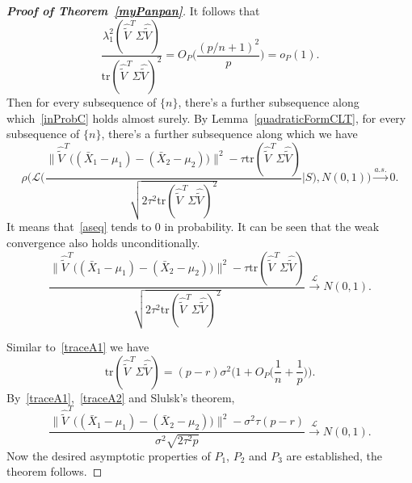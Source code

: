 \documentclass[review]{elsarticle}
\theoremstyle{plain}
\theoremstyle{definition}
\theoremstyle{remark}
\begin{document}
\begin{proof}[\textbf{Proof of Theorem~\ref{myPanpan}}]
    It follows that
\begin{equation}\label{inProbC}
        \frac{\lambda_1^2(\hat{\tilde{V}}^T\Sigma\hat{\tilde{V}})}{\mathrm{tr}(\hat{\tilde{V}}^T\Sigma\hat{\tilde{V}})^2}
        =O_P\Big(\frac{{(p/n+1)}^2}{p}\Big)=o_P(1).
\end{equation}
Then for every subsequence of $\{n\}$, there's a further subsequence along which~\eqref{inProbC} holds almost surely.
By Lemma~\ref{quadraticFormCLT}, for every subsequence of $\{n\}$, there's a further subsequence along which we have
\begin{equation}\label{aseq}
\rho\Big(\mathcal{L}\Big(\frac{\|\hat{\tilde{V}}^T\big((\bar{X}_1-\mu_1)-(\bar{X}_2-\mu_2)\big)\|^2-\tau\mathrm{tr}(\hat{\tilde{V}}^T\Sigma\hat{\tilde{V}})}{\sqrt{2\tau^2\mathrm{tr}(\hat{\tilde{V}}^T\Sigma\hat{\tilde{V}})^2}}\Big|S\Big),N(0,1)\Big)\xrightarrow{a.s.} 0.
\end{equation}
It means that~\eqref{aseq} tends to $0$ in probability.
It can be seen that the weak convergence also holds unconditionally.
$$
\frac{\|\hat{\tilde{V}}^T\big((\bar{X}_1-\mu_1)-(\bar{X}_2-\mu_2)\big)\|^2-\tau\mathrm{tr}(\hat{\tilde{V}}^T\Sigma\hat{\tilde{V}})}{\sqrt{2\tau^2\mathrm{tr}(\hat{\tilde{V}}^T\Sigma\hat{\tilde{V}})^2}}\xrightarrow{\mathcal{L}}N(0,1).
$$

Similar to~\eqref{traceA1} we have
\begin{equation}\label{traceA2}
    \mathrm{tr}(\hat{\tilde{V}}^T\Sigma\hat{\tilde{V}})=(p-r)\sigma^2\big(1+O_P\big(\frac{1}{n}+\frac{1}{p}\big)\big).
\end{equation}
By~\eqref{traceA1},~\eqref{traceA2} and Slulsk's theorem,
$$
\frac{\|\hat{\tilde{V}}^T\big((\bar{X}_1-\mu_1)-(\bar{X}_2-\mu_2)\big)\|^2-\sigma^2\tau(p-r) }{\sigma^2\sqrt{2\tau^2 p}}\xrightarrow{\mathcal{L}}N(0,1).
$$
Now the desired asymptotic properties of $P_1$, $P_2$ and $P_3$ are established, the theorem follows.
\end{proof}
\end{document}
